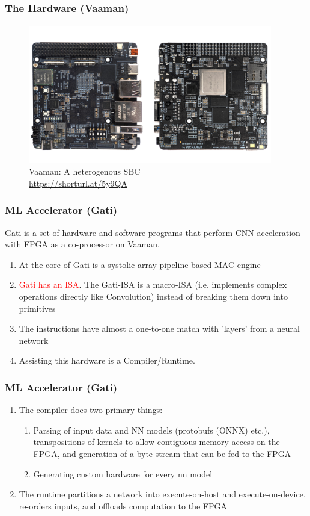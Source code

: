 \documentclass{beamer}
\begin{document}
{\begin{frame}[fragile]
  \frametitle{The Hardware (Vaaman)}
  \framesubtitle{}
  \begin{figure}
    \centering
    \includegraphics[width=0.95\textwidth]{vaaman.jpg}
    \caption{Vaaman: A heterogenous SBC \\ \url{https://shorturl.at/5y9QA}}
    \label{neuron}
  \end{figure}
  
\end{frame}

\begin{frame}[fragile]
  \frametitle{ML Accelerator (Gati)}
  Gati is a set of hardware and software programs that perform CNN
  acceleration with FPGA as a co-processor on Vaaman.
  \begin{enumerate}
    \item At the core of Gati is a systolic array pipeline based MAC engine
    \item \textcolor{red}{Gati has an ISA}. The Gati-ISA is a macro-ISA (i.e. implements complex operations directly
      like Convolution) instead of breaking them down into primitives
    \item The instructions have almost a one-to-one match with 'layers'
      from a neural network
    \item Assisting this hardware is a Compiler/Runtime.
  \end{enumerate}
\end{frame}

\begin{frame}[fragile]
  \frametitle{ML Accelerator (Gati)}
  \begin{enumerate}
    \item The compiler does two primary things:
      \begin{enumerate}
        \item Parsing of input data and NN models (protobufs (ONNX) etc.),
          transpositions of kernels to allow contiguous memory access on the 
          FPGA, and generation
          of a byte stream that can be fed to the FPGA
        \item Generating custom hardware for every nn model
      \end{enumerate}
    \item The runtime partitions a network into execute-on-host and
      execute-on-device, re-orders inputs, and offloads computation
      to the FPGA
  \end{enumerate}
\end{frame}

}
\end{document}
